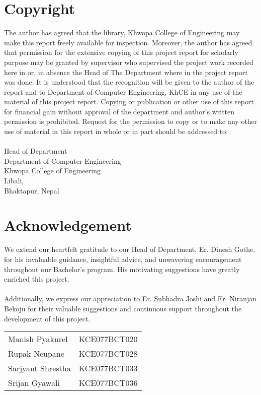 \large
	\chapter*{Copyright}
\normalsize
{}
	The author has agreed that the library, Khwopa College of Engineering  may make this report freely available for inspection. Moreover, the author has agreed that permission for the extensive copying of this project report for scholarly purpose may be granted by supervisor who supervised the project work recorded here in or, in absence the Head of The Department where in the project report was done. It is understood that the recognition will be given to the author of the report and to Department of Computer Engineering, KhCE in any use of the material of this project report. Copying or publication or other use of this report for financial gain without approval of the department and author’s written permission is prohibited. Request for the permission to copy or to make any other use of material in this report in whole or in part should be addressed to: \\
	\vspace{1cm} \\
	Head of Department \\
	Department of Computer Engineering\\
	Khwopa College of Engineering\\
	Libali,\\
	Bhaktapur, Nepal\\
\pagebreak


\large
\chapter*{Acknowledgement}
\normalsize
{}
We extend our heartfelt gratitude to our Head of Department, Er. Dinesh Gothe, for his invaluable guidance, insightful advice, and unwavering encouragement throughout our Bachelor's program. His motivating suggestions have greatly enriched this project.\\\\
Additionally, we express our appreciation to Er. Subhadra Joshi and Er. Niranjan Bekoju for their valuable suggestions and continuous support throughout the development of this project.
\begin{table}[h]
	\begin{tabular}{@{}ll}
		Manish Pyakurel    & KCE077BCT020 \\
		Rupak Neupane      & KCE077BCT028 \\
		Sarjyant Shrestha  & KCE077BCT033 \\
		Srijan Gyawali     & KCE077BCT036 \\
	\end{tabular}
\end{table}
\pagebreak

